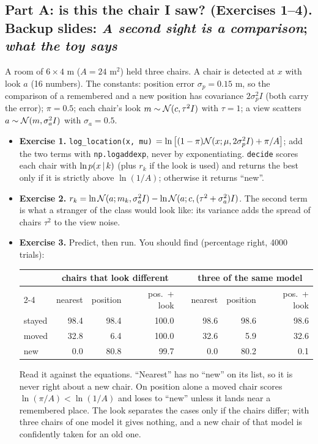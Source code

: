 \documentclass[11pt]{article}
\begin{document}
\subsection*{Part A: is this the chair I saw? (Exercises 1--4). Backup slides: \emph{A second sight is a comparison}; \emph{what the toy says}}
A room of $6\times4$ m ($A=24$ m$^2$) held three chairs. A chair is detected at $x$ with look $a$ (16 numbers). The constants: position error $\sigma_p=0.15$ m, so the comparison of a remembered and a new position has covariance $2\sigma_p^2I$ (both carry the error); $\pi=0.5$; each chair's look $m\sim\mathcal{N}(c,\tau^2I)$ with $\tau=1$; a view scatters $a\sim\mathcal{N}(m,\sigma_a^2I)$ with $\sigma_a=0.5$.
\begin{itemize}
\item \textbf{Exercise 1.} \texttt{log\_location(x, mu)} $=\ln\big[(1-\pi)\mathcal{N}(x;\mu,2\sigma_p^2I)+\pi/A\big]$; add the two terms with \texttt{np.logaddexp}, never by exponentiating. \texttt{decide} scores each chair with $\ln p(x\,|\, k)$ (plus $r_k$ if the look is used) and returns the best only if it is strictly above $\ln(1/A)$; otherwise it returns ``new''.
\item \textbf{Exercise 2.} $r_k=\ln\mathcal{N}(a;m_k,\sigma_a^2I)-\ln\mathcal{N}(a;c,(\tau^2+\sigma_a^2)I)$. The second term is what a stranger of the class would look like: its variance adds the spread of chairs $\tau^2$ to the view noise.
\item \textbf{Exercise 3.} Predict, then run. You should find (percentage right, 4000 trials):
\begin{center}\small
\begin{tabular}{@{}l rrr c rrr@{}}
\toprule
 & \multicolumn{3}{c}{chairs that look different} & & \multicolumn{3}{c}{three of the same model}\\
\cmidrule{2-4}\cmidrule{6-8}
 & nearest & position & pos.\ + look & & nearest & position & pos.\ + look\\\midrule
stayed & 98.4 & 98.4 & 100.0 & & 98.6 & 98.6 & 98.6\\
moved & 32.8 & 6.4 & 100.0 & & 32.6 & 5.9 & 32.6\\
new & 0.0 & 80.8 & 99.7 & & 0.0 & 80.2 & 0.1\\
\bottomrule
\end{tabular}
\end{center}
Read it against the equations. ``Nearest'' has no ``new'' on its list, so it is never right about a new chair. On position alone a moved chair scores $\ln(\pi/A)<\ln(1/A)$ and loses to ``new'' unless it lands near a remembered place. The look separates the cases only if the chairs differ; with three chairs of one model it gives nothing, and a new chair of that model is confidently taken for an old one.

\end{itemize}
\end{document}

